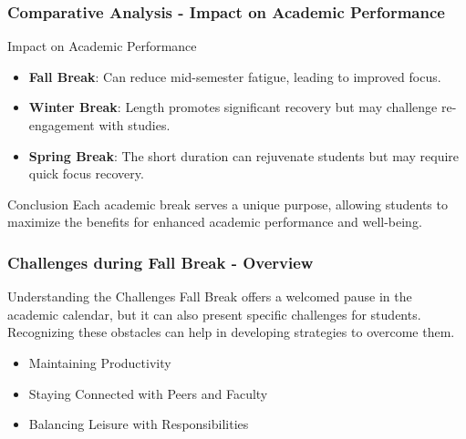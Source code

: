 \documentclass[aspectratio=169]{beamer}
\begin{document}
\begin{frame}[fragile]
    \frametitle{Comparative Analysis - Impact on Academic Performance}
    \begin{block}{Impact on Academic Performance}
        \begin{itemize}
            \item \textbf{Fall Break}: Can reduce mid-semester fatigue, leading to improved focus.
            \item \textbf{Winter Break}: Length promotes significant recovery but may challenge re-engagement with studies.
            \item \textbf{Spring Break}: The short duration can rejuvenate students but may require quick focus recovery.
        \end{itemize}
    \end{block}

    \begin{block}{Conclusion}
        Each academic break serves a unique purpose, allowing students to maximize the benefits for enhanced academic performance and well-being.
    \end{block}
\end{frame}

\begin{frame}[fragile]
    \frametitle{Challenges during Fall Break - Overview}
    \begin{block}{Understanding the Challenges}
        Fall Break offers a welcomed pause in the academic calendar, but it can also present specific challenges for students. Recognizing these obstacles can help in developing strategies to overcome them.
    \end{block}
    
    \begin{itemize}
        \item Maintaining Productivity
        \item Staying Connected with Peers and Faculty
        \item Balancing Leisure with Responsibilities
    \end{itemize}
\end{frame}
\end{document}
